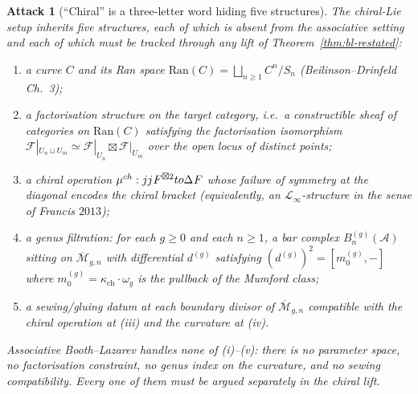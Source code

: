\documentclass[11pt]{amsart}
\newtheorem{attack}{Attack}
\newcommand{\kch}{\kappa_{\mathrm{ch}}}
\newcommand{\cA}{\mathcal{A}}
\newcommand{\cF}{\mathcal{F}}
\newcommand{\cL}{\mathcal{L}}
\newcommand{\cM}{\mathcal{M}}
\newcommand{\Ran}{\mathrm{Ran}}
\newcommand{\Mbar}{\overline{\cM}}
\begin{document}
\begin{attack}[``Chiral'' is a three-letter word hiding five structures]
The chiral-Lie setup inherits five structures, each of which is absent
from the associative setting and each of which must be tracked through
any lift of Theorem~\ref{thm:bl-restated}:
\begin{enumerate}[label=(\roman*)]
\item a curve $C$ and its Ran space
$\Ran(C)=\bigsqcup_{n\geq 1}C^n/S_n$ (Beilinson--Drinfeld Ch.~3);
\item a factorisation structure on the target category, i.e.\ a
constructible sheaf of categories on $\Ran(C)$ satisfying the
factorisation isomorphism
$\cF|_{U_n\sqcup U_m}\simeq\cF|_{U_n}\boxtimes\cF|_{U_m}$ over
the open locus of distinct points;
\item a chiral operation
$\mu^{\mathrm{ch}}:j_{\*}j^{\*}\cF^{\boxtimes 2}
\to\Delta_{\*}\cF$
whose failure of symmetry at the diagonal encodes the chiral bracket
(equivalently, an $\cL_\infty$-structure in the sense of
Francis $2013$);
\item a genus filtration: for each $g\geq 0$ and each $n\geq 1$, a
bar complex $B^{(g)}_n(\cA)$ sitting on $\Mbar_{g,n}$ with
differential $d^{(g)}$ satisfying
$(d^{(g)})^2=[m_0^{(g)},-]$ where $m_0^{(g)}=\kch\cdot\omega_g$ is
the pullback of the Mumford class;
\item a sewing/gluing datum at each boundary divisor of $\Mbar_{g,n}$
compatible with the chiral operation at (iii) and the curvature at
(iv).
\end{enumerate}
Associative Booth--Lazarev handles none of (i)--(v): there is no
parameter space, no factorisation constraint, no genus index on the
curvature, and no sewing compatibility. Every one of them must be
argued separately in the chiral lift.
\end{attack}
\end{document}
